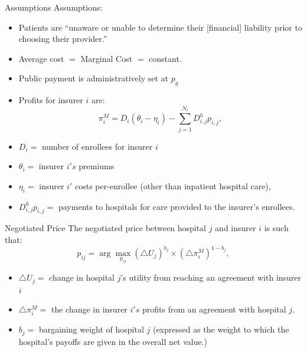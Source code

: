 \documentclass[ucs,9pt]{beamer}
\begin{document}
\begin{frame}{Assumptions}
Assumptions:
\begin{itemize}
\item Patients are ``unaware or unable to determine their [financial] liability prior to choosing their provider.''
\item Average cost $=$ Marginal Cost $=$ constant.
\item Public payment is administratively set at $p_{g}$
\item Profits for insurer $i$ are:
\begin{equation}
\pi_{i}^{M} = D_{i} \left( \theta_{i} - \eta_{i} \right) - \sum_{j=1}^{N_{i}} D_{i,j}^{h} p_{i,j},
\label{eqn:ins_profit}
\end{equation}
\item $D_{i}=$ number of enrollees for insurer $i$
\item $\theta_{i}=$ insurer $i's$ premiums
\item $\eta_{i}=$ insurer $i'$ costs per-enrollee (other than inpatient hospital care), 
\item $D_{i,j}^{h} p_{i,j}=$ payments to hospitals for care provided to the insurer's enrollees.
\end{itemize}
\end{frame}




\begin{frame}{Negotiated Price}
The negotiated price between hospital $j$ and insurer $i$ is such that:
\begin{displaymath}
 p_{ij}= \arg \max_{p_{ij}} \left(\triangle U_{j} \right)^{b_{j}} \times \left(\triangle \pi^{M}_{i} \right)^{1-b_{j}},
 \label{eqn:neg_price}
\end{displaymath}
\begin{itemize}
\item $\triangle U_{j}=$ change in hospital $j$'s utility from reaching an agreement with insurer $i$
\item $\triangle \pi^{M}_{i}=$ the change in insurer $i's$ profits from an agreement with hospital $j$. 
\item $b_{j}=$ bargaining weight of hospital $j$ (expressed as the weight to which the hospital's payoffs are given in the overall net value.)
\end{itemize}
\end{frame}
\end{document}
